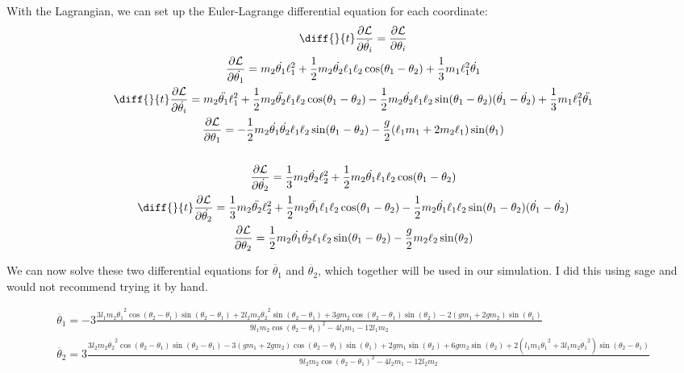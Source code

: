 \documentclass[]{article}
\begin{document}
With the Lagrangian, we can set up the Euler-Lagrange differential equation for each coordinate:
\begin{gather*}
	\diff{}{t}\frac{\partial \lagr}{\partial \dot{\theta_i}} = \frac{\partial \lagr}{\partial \theta_i} \\
	\frac{\partial \lagr}{\partial \dot{\theta_1}} = m_2\dot{\theta_1}\ell_1^2 + \frac12m_2\dot{\theta_2}\ell_1\ell_2\cos(\theta_1 - \theta_2) + \frac13m_1\ell_1^2\dot{\theta_1} \\
	\diff{}{t}\frac{\partial \lagr}{\partial \dot{\theta_i}} = m_2\ddot{\theta_1}\ell_1^2 + \frac12m_2\ddot{\theta_2}\ell_1\ell_2\cos(\theta_1 - \theta_2) - \frac12m_2\dot{\theta_2}\ell_1\ell_2\sin(\theta_1 - \theta_2)(\dot{\theta_1} - \dot{\theta_2}) + \frac13m_1\ell_1^2\ddot{\theta_1} \\
	\frac{\partial \lagr}{\partial \theta_1} = - \frac12m_2\dot{\theta_1}\dot{\theta_2}\ell_1\ell_2\sin(\theta_1 - \theta_2) - \frac{g}{2}(\ell_1m_1 + 2m_2\ell_1)\sin(\theta_1) \\ \\
	\frac{\partial \lagr}{\partial \dot{\theta_2}} =  \frac13m_2\dot{\theta_2}\ell_2^2 + \frac12m_2\dot{\theta_1}\ell_1\ell_2\cos(\theta_1 - \theta_2) \\
	\diff{}{t}\frac{\partial \lagr}{\partial \dot{\theta_2}} = \frac13m_2\ddot{\theta_2}\ell_2^2 + \frac12m_2\ddot{\theta_1}\ell_1\ell_2\cos(\theta_1 - \theta_2) - \frac12m_2\dot{\theta_1}\ell_1\ell_2\sin(\theta_1 - \theta_2)(\dot{\theta_1} - \dot{\theta_2}) \\
	\frac{\partial \lagr}{\partial \theta_2} = \frac12m_2\dot{\theta_1}\dot{\theta_2}\ell_1\ell_2\sin(\theta_1 - \theta_2) - \frac{g}{2}m_2\ell_2\sin(\theta_2)
\end{gather*}

We can now solve these two differential equations for $\ddot{\theta_1}$ and $\ddot{\theta_2}$, which together will be used in our simulation. I did this using sage and would not recommend trying it by hand.

\begin{gather*}
	\ddot{\theta_1} = -3\frac{3  l_1 m_2 {\dot{\theta_1}}^2 \cos(\theta_2 - \theta_1) \sin(\theta_2 - \theta_1) + 2  l_2 m_2 {\dot{\theta_2}}^2 \sin(\theta_2 - \theta_1) + 3  g m_2 \cos(\theta_2 - \theta_1) \sin(\theta_2) - 2  {(g m_1 + 2  g m_2)} \sin(\theta_1)}{9  l_1 m_2 \cos(\theta_2 - \theta_1)^2 - 4  l_1 m_1 - 12  l_1 m_2}
	\\
	\ddot{\theta_2} = 3\frac{3  l_2 m_2 {\dot{\theta_2}}^2 \cos(\theta_2 - \theta_1) \sin(\theta_2 - \theta_1) - 3  {(g m_1 + 2  g m_2)} \cos(\theta_2 - \theta_1) \sin(\theta_1) + 2  g m_1 \sin(\theta_2) + 6  g m_2 \sin(\theta_2) + 2  {(l_1 m_1 {\dot{\theta_1}}^2 + 3  l_1 m_2 {\dot{\theta_1}}^2)} \sin(\theta_2 - \theta_1)}{9  l_2 m_2 \cos(\theta_2 - \theta_1)^2 - 4  l_2 m_1 - 12  l_2 m_2}
\end{gather*}
\end{document}
